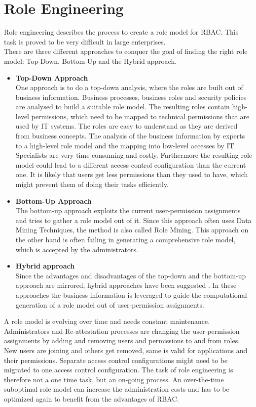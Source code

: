     \section{Role Engineering}
    Role engineering \cite{Coyne:2011} describes the process to create a role model for RBAC. This task is proved to be very difficult in large enterprises.\\
    There are three different approaches to conquer the goal of finding the right role model: Top-Down, Bottom-Up and the Hybrid approach\cite{Coyne:2011}\cite{Frank}.
    \begin{itemize}
        \item \textbf{Top-Down Approach}\\
        One approach is to do a top-down analysis, where the roles are built out of business information. Business processes, business roles and security policies are analysed to build a suitable role model. The resulting roles contain high-level permissions, which need to be mapped to technical permissions that are used by IT systems. The roles are easy to understand as they are derived from business concepts. The analysis of the business information by experts to a high-level role model and the mapping into low-level accesses by IT Specialists are very time-consuming and costly. Furthermore the resulting role model could lead to a different access control configuration than the current one. It is likely that users get less permissions than they used to have, which might prevent them of doing their tasks efficiently.
        \item \textbf{Bottom-Up Approach}\\
        The bottom-up approach exploits the current user-permission assignments and tries to gather a role model out of it. Since this approach often uses Data Mining Techniques, the method is also called Role Mining\cite{Kuhlmann}. This approach on the other hand is often failing in generating a comprehensive role model, which is accepted by the administrators\cite{Frank:2013}.
        \item \textbf{Hybrid approach}\\
        Since the advantages and disadvantages of the top-down and the bottom-up approach are mirrored, hybrid approaches have been suggested \cite{Frank}\cite{6274146}. In these approaches the business information is leveraged to guide the computational generation of a role model out of user-permission assignments.
    \end{itemize}
    A role model is evolving over time and needs constant maintenance\cite{Montrieux:2011}. Administrators and Re-attestation processes are changing the user-permission assignments by adding and removing users and permissions to and from roles. New users are joining and others get removed, same is valid for applications and their permissions. Separate access control configurations might need to be migrated to one access control configuration. The task of role engineering is therefore not a one time task, but an on-going process. An over-the-time suboptimal role model can increase the administration costs and has to be optimized again to benefit from the advantages of RBAC.
    
